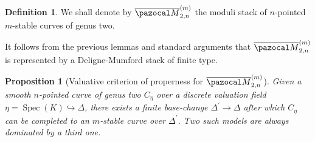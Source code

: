 \documentclass{compositio}
\renewcommand{\to}{\rightarrow}
\newcommand{\oM}{\overline{\pazocal M}}
\newcommand{\dvr}{\Delta}
\theoremstyle{plain}
\newtheorem{prop}[thm]{Proposition}
\theoremstyle{definition}
\newtheorem{definition}[thm]{Definition}
\theoremstyle{remark}
\begin{document}
\begin{definition}
 We shall denote by $\oM^{(m)}_{2,n}$ the moduli stack of $n$-pointed $m$-stable curves of genus two.
\end{definition}

It follows from the previous lemmas and standard arguments that $\oM^{(m)}_{2,n}$ is represented by a Deligne-Mumford stack of finite type.

\begin{prop}[Valuative criterion of properness for $\oM^{(m)}_{2,n}$]
 Given a smooth $n$-pointed curve of genus two $C_\eta$ over a discrete valuation field $\eta=\operatorname{Spec}(K)\hookrightarrow\dvr$, there exists a finite base-change $\dvr^\prime\to\dvr$ after which $C_\eta$ can be completed to an \emph{$m$-stable} curve over $\dvr^\prime$. Two such models are always dominated by a third one.
\end{prop}
\end{document}
